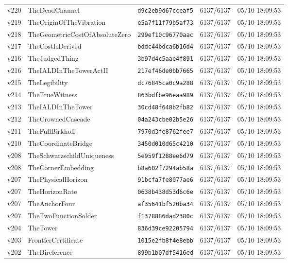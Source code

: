 \documentclass[11pt]{article}
\theoremstyle{definition}\newtheorem{deriv}{Derivation}
\begin{document}
{\begin{longtable}{@{}lllll@{}}
v220 & TheDeadChannel & \texttt{d9c2eb9d67cceaf5} & 6137/6137 & 05/10 18:09:53 \\
v219 & TheOriginOfTheVibration & \texttt{e5a7f11f79b5af73} & 6137/6137 & 05/10 18:09:53 \\
v218 & TheGeometricCostOfAbsoluteZero & \texttt{299ef10c96770aac} & 6137/6137 & 05/10 18:09:53 \\
v217 & TheCostIsDerived & \texttt{bddc44bdca6b16d4} & 6137/6137 & 05/10 18:09:53 \\
v216 & TheJudgedThing & \texttt{3b97d4c5aae4f891} & 6137/6137 & 05/10 18:09:53 \\
v216 & TheIALDInTheTowerActII & \texttt{217ef46de0bb7665} & 6137/6137 & 05/10 18:09:53 \\
v215 & TheLegibility & \texttt{dc76845ca0c9a288} & 6137/6137 & 05/10 18:09:53 \\
v214 & TheTrueWitness & \texttt{863bdfbe96eaa989} & 6137/6137 & 05/10 18:09:53 \\
v213 & TheIALDInTheTower & \texttt{30cd48f648b2fb82} & 6137/6137 & 05/10 18:09:53 \\
v212 & TheCrownedCascade & \texttt{04a243cbe02b5e26} & 6137/6137 & 05/10 18:09:53 \\
v211 & TheFullBirkhoff & \texttt{7970d3fe8762fee7} & 6137/6137 & 05/10 18:09:53 \\
v210 & TheCoordinateBridge & \texttt{3450d010d65c4210} & 6137/6137 & 05/10 18:09:53 \\
v208 & TheSchwarzschildUniqueness & \texttt{5e959f1288ee6d79} & 6137/6137 & 05/10 18:09:53 \\
v208 & TheCornerEmbedding & \texttt{b8a602f7294ab58a} & 6137/6137 & 05/10 18:09:53 \\
v207 & ThePhysicalHorizon & \texttt{91bcfa7fe8077ae6} & 6137/6137 & 05/10 18:09:53 \\
v207 & TheHorizonRate & \texttt{0638b438d53d6c6e} & 6137/6137 & 05/10 18:09:53 \\
v207 & TheAnchorFour & \texttt{af35641bf520ba34} & 6137/6137 & 05/10 18:09:53 \\
v207 & TheTwoFunctionSolder & \texttt{f1378886dad2380c} & 6137/6137 & 05/10 18:09:53 \\
v204 & TheTower & \texttt{836d39ce92205794} & 6137/6137 & 05/10 18:09:53 \\
v203 & FrontierCertificate & \texttt{1015e2fb8f4e8ebb} & 6137/6137 & 05/10 18:09:53 \\
v202 & TheBireference & \texttt{899b1b07df5416ed} & 6137/6137 & 05/10 18:09:53 \\

\end{longtable}}
\end{document}
